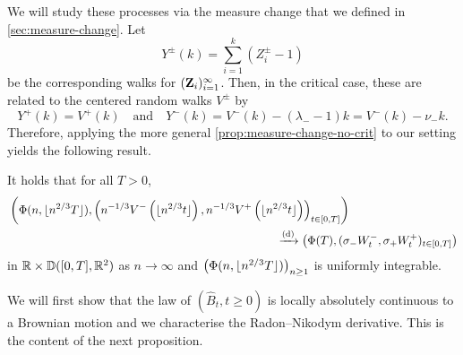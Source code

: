 We will study these processes via the measure change that we defined in \cref{sec:measure-change}. Let
\begin{equation*}
  Y^{\pm}(k) = \sum_{i=1}^k (Z_i^{\pm} - 1)
\end{equation*}
be the corresponding walks for $({\mathbf Z}_i)_{i=1}^{\infty}$. Then, in the critical case, these are related to the centered random walks $V^{\pm}$ by
\begin{equation*}
  Y^+(k) = V^+(k)
  \quad \text{and} \quad
  Y^-(k) = V^-(k) - (\lambda_- - 1) k = V^-(k) - \nu_- k.
\end{equation*}
Therefore, applying the more general \cref{prop:measure-change-no-crit} to our setting yields the following result.
\begin{corollary}
  \label{cor:measure-change}
  It holds that for all $T > 0$,
  \begin{align*}
      &\left( 
          \Phi(n, \floor{n^{2/3} T}),
          \left(
              n^{-1/3} V^-\left( \floor{n^{2/3} t} \right),
              n^{-1/3} V^+\left( \floor{n^{2/3} t} \right)
          \right)_{t \in [0, T]}
      \right) \\
      & \hspace{23em} \todist \left( 
          \Phi(T),
          (\sigma_- W^-_t, \sigma_+ W^+_t)_{t \in [0, T]}
      \right)
  \end{align*}
  in ${\mathbb R} \times {\mathbb D}([0, T], {\mathbb R}^2)$ as $n \to \infty$ and $\left(\Phi(n,\lfloor n^{2/3} T\rfloor)\right)_{n\geq 1}$ is uniformly integrable.
\end{corollary}
We will first show that the law of $(\hat{B}_t,t\geq 0)$ is locally absolutely continuous to a Brownian motion and we characterise the Radon--Nikodym derivative. This is the content of the next proposition. 

